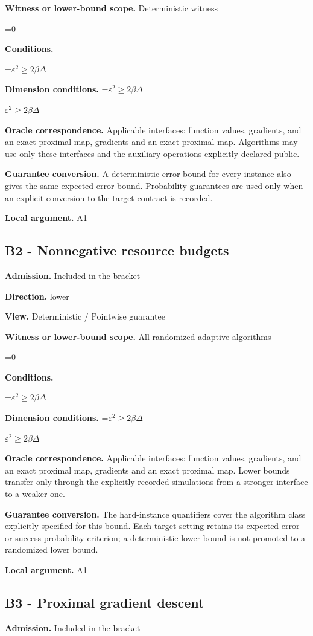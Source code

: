 \documentclass[10pt,a4paper]{article}
\newcommand{\AtlasMath}[1]{\par\begingroup\centering\setbox0=\hbox{$\displaystyle #1$}\ifdim\wd0>1.4\linewidth\typeout{ATLAS WIDE FORMULA: \the\wd0}\fi\ifdim\wd0>\linewidth\resizebox{\linewidth}{!}{\box0}\else\box0\fi\par\endgroup}
\newcommand{\AtlasInlineMath}[1]{\begingroup\setbox0=\hbox{$#1$}\ifdim\wd0>.4\linewidth\endgroup\AtlasMath{#1}\else\endgroup$#1$\fi}
\begin{document}
\textbf{Witness or lower-bound scope.} Deterministic witness

\AtlasMath{0}
\textbf{Conditions.} 
\AtlasMath{\varepsilon^2\ge2\beta\Delta}


\textbf{Dimension conditions.} \AtlasInlineMath{\varepsilon^2\ge2\beta\Delta}

\textbf{Oracle correspondence.} Applicable interfaces: function values, gradients, and an exact proximal map, gradients and an exact proximal map. Algorithms may use only these interfaces and the auxiliary operations explicitly declared public.

\textbf{Guarantee conversion.} A deterministic error bound for every instance also gives the same expected-error bound. Probability guarantees are used only when an explicit conversion to the target contract is recorded.

\textbf{Local argument.} A1

\subsection{B2 - Nonnegative resource budgets}
\textbf{Admission.} Included in the bracket

\textbf{Direction.} lower

\textbf{View.} Deterministic / Pointwise guarantee

\textbf{Witness or lower-bound scope.} All randomized adaptive algorithms

\AtlasMath{0}
\textbf{Conditions.} 
\AtlasMath{\varepsilon^2\ge2\beta\Delta}


\textbf{Dimension conditions.} \AtlasInlineMath{\varepsilon^2\ge2\beta\Delta}

\textbf{Oracle correspondence.} Applicable interfaces: function values, gradients, and an exact proximal map, gradients and an exact proximal map. Lower bounds transfer only through the explicitly recorded simulations from a stronger interface to a weaker one.

\textbf{Guarantee conversion.} The hard-instance quantifiers cover the algorithm class explicitly specified for this bound. Each target setting retains its expected-error or success-probability criterion; a deterministic lower bound is not promoted to a randomized lower bound.

\textbf{Local argument.} A1

\subsection{B3 - Proximal gradient descent}
\textbf{Admission.} Included in the bracket
\end{document}
